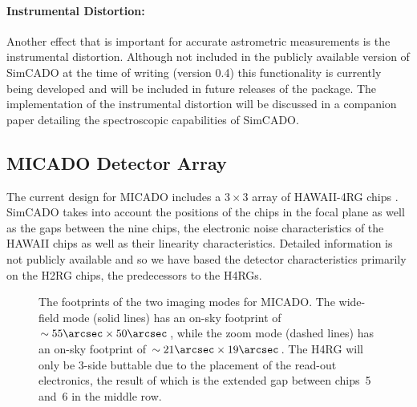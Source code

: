 \paragraph{Instrumental Distortion:} Another effect that is important for accurate astrometric measurements is the instrumental distortion. Although not included in the publicly available version of SimCADO at the time of writing (version 0.4) this functionality is currently being developed and will be included in future releases of the package. The implementation of the instrumental distortion will be discussed in a companion paper detailing the spectroscopic capabilities of SimCADO.

\subsection{MICADO Detector Array}
The current design for MICADO includes a $3\times 3$ array of HAWAII-4RG chips \citep{micado2016}. SimCADO takes into account the positions of the chips in the focal plane as well as the gaps between the nine chips, the electronic noise characteristics of the HAWAII chips as well as their linearity characteristics. Detailed information is not publicly available and so we have based the detector characteristics primarily on the H2RG chips, the predecessors to the H4RGs.

\begin{figure}
    
    \centering
    
    \caption{The footprints of the two imaging modes for MICADO. The wide-field mode (solid lines) has an on-sky footprint of $\sim 55\arcsec \times 50\arcsec$, while the zoom mode (dashed lines) has an on-sky footprint of $\sim 21\arcsec \times 19\arcsec$. The H4RG will only be 3-side buttable due to the placement of the read-out electronics, the result of which is the extended gap between chips~5 and~6 in the middle row.}
    
    \label{fig:fpa_footprint}
    
\end{figure}



